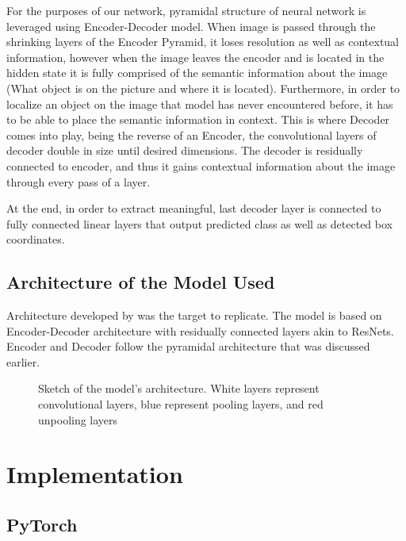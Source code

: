 For the purposes of our network, pyramidal structure of neural network is leveraged using
Encoder-Decoder model. When image is passed through the shrinking layers of the Encoder
Pyramid, it loses resolution as well as contextual information, however when the image
leaves the encoder and is located in the hidden state it is fully comprised of
the semantic information about the image (What object is on the picture and where it is
located). Furthermore, in order to localize an object on the image that model has never 
encountered before, it has to be able to place the semantic information in context. 
This is where Decoder comes into play, being the reverse of an Encoder, the convolutional
layers of decoder double in size until desired dimensions. The decoder is residually
connected to encoder, and thus it gains contextual information about the image through
every pass of a layer.

At the end, in order to extract meaningful, last decoder layer is connected
to fully connected linear layers that  output predicted class as well as
detected box coordinates.





\subsection{Architecture of the Model Used}


Architecture developed by  was the target to replicate. The model is based
on Encoder-Decoder architecture with residually connected layers akin to ResNets. Encoder and 
Decoder follow the pyramidal architecture that was discussed earlier. 

\begin{figure}[h]
	\begin{center}
	
	\end{center}
	\caption{Sketch of the model's architecture. White layers represent convolutional layers,
	blue represent pooling layers, and red unpooling layers}
\end{figure}




\section{Implementation}

\subsection{PyTorch}

